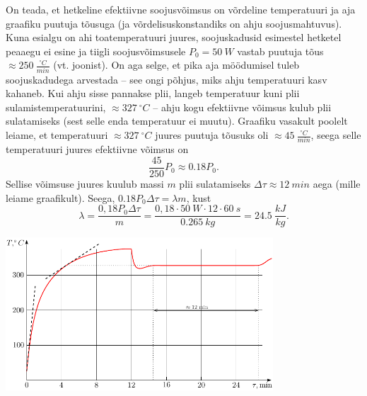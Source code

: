\solu
On teada, et hetkeline efektiivne soojusvõimsus on võrdeline temperatuuri ja aja graafiku puutuja tõusuga (ja võrdelisuskonstandiks on ahju soojusmahtuvus). Kuna esialgu on ahi toatemperatuuri juures, soojuskadusid esimestel hetketel peaaegu ei esine ja tiigli soojusvõimsusele $P_0 = \SI{50}{W}$ vastab puutuja tõus $\approx \SI{250}{\frac{^{\circ}C} {min}}$ (vt. joonist). On aga selge, et pika aja möödumisel tuleb soojuskadudega arvestada -- see ongi põhjus, miks ahju temperatuuri kasv kahaneb. Kui ahju sisse pannakse plii, langeb temperatuur kuni plii sulamistemperatuurini, $\approx \SI{327}{^\circ C}$ -- ahju kogu efektiivne võimsus kulub plii sulatamiseks (sest selle enda temperatuur ei muutu). Graafiku vasakult poolelt leiame, et temperatuuri $\approx \SI{327}{^\circ C}$ juures puutuja tõusuks oli $\approx \SI{45}{\frac{^{\circ}C} {min}}$, seega selle temperatuuri juures efektiivne võimsus on
\[
\frac{45}{250}P_0 \approx \num{0.18}P_0.
\]
Sellise võimsuse juures kuulub massi $m$ plii sulatamiseks $\Delta\tau \approx \SI{12}{min}$ aega (mille leiame graafikult). Seega, $\num{0.18} P_0 \Delta\tau = \lambda m$, kust
\[
\lambda = \frac{0,18 P_0 \Delta \tau}{ m} = \frac{0,18 \cdot \SI{50}{W} \cdot 12 \cdot \SI{60}{s}}{\SI{0.265}{kg}} = \SI{24.5}{\frac{kJ}{kg}}.
\]
\begin{center}
\includegraphics[width = 0.75\textwidth]{2012-v3g-07-ahi_lah}
\end{center}

